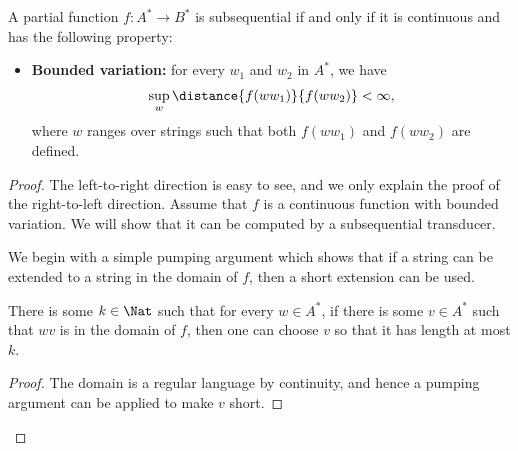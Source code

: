 \begin{theorem}\label{thm:subsequential-functions}
        A partial function $f : A^* \to B^*$ is subsequential if and only if it is continuous and has the following  property: 
        \begin{itemize}
            \item \textbf{Bounded variation:}  for every $w_1$ and $w_2$ in $A^*$, we have 
            \begin{align*}
            \sup_{w} \distance{ f(ww_1)}{f(ww_2)} < \infty,
        \end{align*}
        where  $w$ ranges over strings such that both $f(w w_1)$ and $f(ww_2)$ are defined.
        \end{itemize}
\end{theorem}
\begin{proof}
    The left-to-right direction is easy to see, and we only explain the proof of the right-to-left direction. Assume that $f$ is a continuous function with bounded variation. We will show that it can be computed by a subsequential transducer. 
 
    We begin with a simple pumping argument which shows that if a string can be extended to a string in the domain of $f$, then a short extension can be used.
   \begin{claim}\label{claim:bounded-extensions}
    There is some $k \in \Nat$ such that for every $w \in A^*$, if there is some $v \in A^*$ such that $wv$ is in the domain of $f$, then one can choose $v$ so that it has length at most $k$.
   \end{claim}
   \begin{proof}
    The domain is a regular language by continuity, and hence a pumping argument can be applied to make $v$ short.
   \end{proof}


\end{proof}
